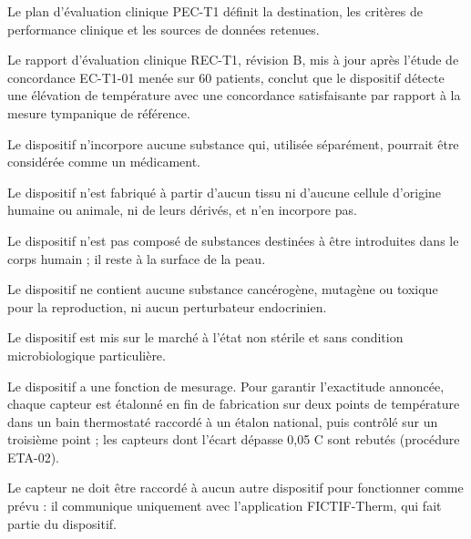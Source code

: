 \documentclass[11pt,a4paper]{article}
\begin{document}
\par{}\par

{\small Le plan d'évaluation clinique PEC-T1 définit la destination, les critères de performance clinique et les sources de données retenues.}\par

{\small Le rapport d'évaluation clinique REC-T1, révision B, mis à jour après l'étude de concordance EC-T1-01 menée sur 60 patients, conclut que le dispositif détecte une élévation de température avec une concordance satisfaisante par rapport à la mesure tympanique de référence.}\par

\par{}\par

{\small Le dispositif n'incorpore aucune substance qui, utilisée séparément, pourrait être considérée comme un médicament.}\par

{\small Le dispositif n'est fabriqué à partir d'aucun tissu ni d'aucune cellule d'origine humaine ou animale, ni de leurs dérivés, et n'en incorpore pas.}\par

{\small Le dispositif n'est pas composé de substances destinées à être introduites dans le corps humain ; il reste à la surface de la peau.}\par

{\small Le dispositif ne contient aucune substance cancérogène, mutagène ou toxique pour la reproduction, ni aucun perturbateur endocrinien.}\par

{\small Le dispositif est mis sur le marché à l'état non stérile et sans condition microbiologique particulière.}\par

{\small Le dispositif a une fonction de mesurage. Pour garantir l'exactitude annoncée, chaque capteur est étalonné en fin de fabrication sur deux points de température dans un bain thermostaté raccordé à un étalon national, puis contrôlé sur un troisième point ; les capteurs dont l'écart dépasse 0,05 \textdegree{}C sont rebutés (procédure ETA-02).}\par

{\small Le capteur ne doit être raccordé à aucun autre dispositif pour fonctionner comme prévu : il communique uniquement avec l'application FICTIF-Therm, qui fait partie du dispositif.}\par
\end{document}
